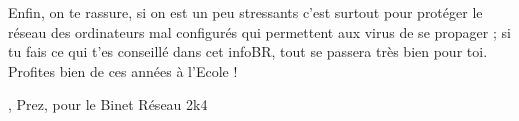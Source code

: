 Enfin, on te rassure, si on est un peu stressants c'est surtout pour prot\'eger le r\'eseau
des ordinateurs mal configur\'es qui permettent aux virus de se propager ;
si tu fais ce qui t'es conseill\'e dans cet infoBR, tout se passera tr\`es bien pour toi.
Profites bien de ces ann\'ees \`a l'Ecole !

\begin{flushright}
, Prez, pour le Binet R\'eseau 2k4
\end{flushright}